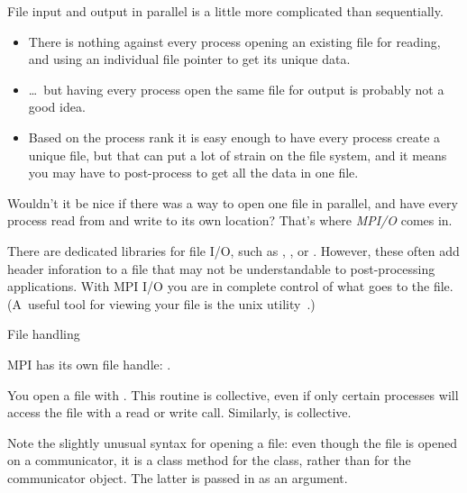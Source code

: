 

File input and output in parallel is a little more complicated than
sequentially.
\begin{itemize}
\item There is nothing against every process opening an existing file
  for reading, and using an individual file pointer to get its unique
  data.
\item \ldots~but having every process open the same file for output is
  probably not a good idea.
\item Based on the process rank it is easy enough to have
  every process create a unique file, but that can put a lot of strain
  on the file system, and it means you may have to post-process 
  to get all the data in one file.
\end{itemize}

Wouldn't it be nice if there was a way to open one file in parallel,
and have every process read from and write to its own location? That's
where \emph{MPI/O} comes in.

There are dedicated libraries for file I/O, such as ,
, or . However, these often add
header inforation to a file that may not be understandable to
post-processing applications. With MPI I/O you are in complete control
of what goes to the file. (A~useful tool for viewing your file is the
unix utility~.)

 {File handling}

MPI has its own file handle:
.

You open a file with
%
.
%
This routine is collective, even if only certain processes will access
the file with a read or write call.
Similarly,  is collective.

\begin{pythonnote}
  Note the slightly unusual syntax for opening a file: even though the file is
  opened on a communicator, it is a class method for the 
  class, rather than for the communicator object. The latter is passed
  in as an argument.
\end{pythonnote}

